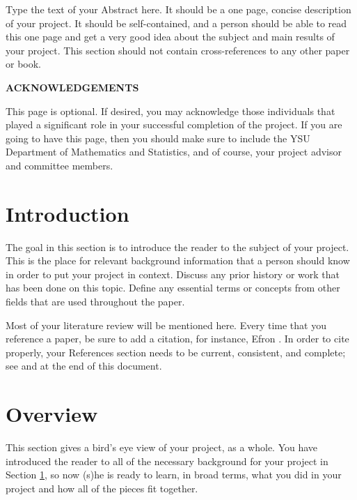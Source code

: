 \documentclass[11pt]{article}
\begin{document}
Type the text of your Abstract here.  It should be a one page, 
concise description of your project. It should be self-contained, 
and a person should be able to read this one page and get a very 
good idea about the subject and main results of your project. 
This section should not contain cross-references to any other 
paper or book. 

\newpage
\begin{center}
\textbf{ACKNOWLEDGEMENTS} 
\end{center} \vspace{0.25in}

This page is optional. If desired, you may acknowledge those 
individuals that played a significant role in your successful 
completion of the project. If you are going to have this page, 
then you should make sure to include the YSU Department of 
Mathematics and Statistics, and of course, your project advisor 
and committee members.

\newpage
\tableofcontents

\newpage
\section[Introduction]{Introduction}
\label{sec-1}

The goal in this section is to introduce the reader to the subject of
your project. This is the place for relevant background information
that a person should know in order to put your project in
context. Discuss any prior history or work that has been done on this
topic. Define any essential terms or concepts from other fields that
are used throughout the paper.

Most of your literature review will be mentioned here. Every time that
you reference a paper, be sure to add a citation, for instance, Efron
\cite{Efron1972}. In order to cite properly, your References section
needs to be current, consistent, and complete; see \cite{Cons} and
\cite{NoCopy} at the end of this document.

\newpage

\section[Overview]{Overview}
\label{sec-2}

This section gives a bird's eye view of your project, as a whole.  You
have introduced the reader to all of the necessary background for your
project in Section \ref{sec-1}, so now (s)he is ready to learn,
in broad terms, what you did in your project and how all of the pieces
fit together.
\end{document}
